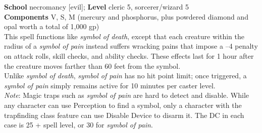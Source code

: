 \textbf{School} necromancy [evil]; \textbf{Level} cleric 5, sorcerer/wizard 5\\
\textbf{Components} V, S, M (mercury and phosphorus, plus powdered diamond and opal worth a total of 1,000 gp)\\
This spell functions like \textit{symbol of death}, except that each creature within the radius of a \textit{symbol of pain }instead suffers wracking pains that impose a –4 penalty on attack rolls, skill checks, and ability checks. These effects last for 1 hour after the creature moves farther than 60 feet from the symbol.\\
Unlike \textit{symbol of death}, \textit{symbol of pain }has no hit point limit; once triggered, a \textit{symbol of pain }simply remains active for 10 minutes per caster level.\\
\textit{Note}: Magic traps such as \textit{symbol of pain }are hard to detect and disable. While any character can use Perception to find a symbol, only a character with the trapfinding class feature can use Disable Device to disarm it. The DC in each case is 25 + spell level, or 30 for \textit{symbol of pain}.\\
